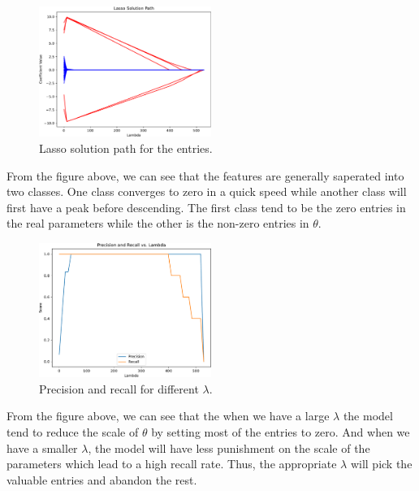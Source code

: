 \documentclass{article}
\begin{document}
\subsection{}
\begin{figure}[htbp]
    \begin{center}
        \includegraphics[width=0.5\textwidth]{./figures/lasso_solution_path.pdf}
    \end{center}
    \caption{Lasso solution path for the entries.}\label{fig:}
\end{figure}
From the figure above, we can see that the features are generally saperated into two classes. One class converges to zero in a quick speed while another class will first have a peak before descending. The first class tend to be the zero entries in the real parameters while the other is the non-zero entries in $ \theta $.
\begin{figure}[htbp]
    \begin{center}
        \includegraphics[width=0.5\textwidth]{./figures/lasso_precision_recall_vs_lambda.pdf}
    \end{center}
    \caption{Precision and recall for different $ \lambda $.}\label{fig:}
\end{figure}
From the figure above, we can see that the when we have a large $ \lambda $ the model tend to reduce the scale of $ \theta $ by setting most of the entries to zero. And when we have a smaller $ \lambda $, the model will have less punishment on the scale of the parameters which lead to a high recall rate. Thus, the appropriate $ \lambda $ will pick the valuable entries and abandon the rest.
\end{document}

